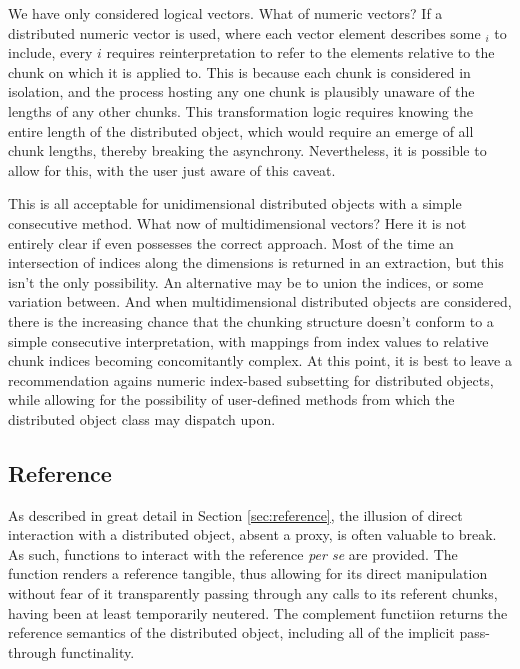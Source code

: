 We have only considered logical vectors.
What of numeric vectors?
If a distributed numeric vector is used, where each vector element describes some $_i$ to include, every $i$ requires reinterpretation to refer to the elements relative to the chunk on which it is applied to.
This is because each chunk is considered in isolation, and the process hosting any one chunk is plausibly unaware of the lengths of any other chunks.
This transformation logic requires knowing the entire length of the distributed object, which would require an emerge of all chunk lengths, thereby breaking the asynchrony.
Nevertheless, it is possible to allow for this, with the user just aware of this caveat.

This is all acceptable for unidimensional distributed objects with a simple consecutive  method.
What now of multidimensional vectors?
Here it is not entirely clear if \R even possesses the correct approach.
Most of the time an intersection of indices along the dimensions is returned in an extraction, but this isn't the only possibility.
An alternative may be to union the indices, or some variation between.
And when multidimensional distributed objects are considered, there is the increasing chance that the chunking structure doesn't conform to a simple consecutive interpretation, with mappings from index values to relative chunk indices becoming concomitantly complex.
At this point, it is best to leave a recommendation agains numeric index-based subsetting for distributed objects, while allowing for the possibility of user-defined methods from which the distributed object class may dispatch upon.

\subsection{Reference}

As described in great detail in Section \cref{sec:reference}, the illusion of direct interaction with a distributed object, absent a proxy, is often valuable to break.
As such, functions to interact with the reference \textit{per se} are provided.
The  function renders a reference tangible, thus allowing for its direct manipulation without fear of it transparently passing through any calls to its referent chunks, having been at least temporarily neutered.
The complement functiion  returns the reference semantics of the distributed object, including all of the implicit pass-through functinality.

